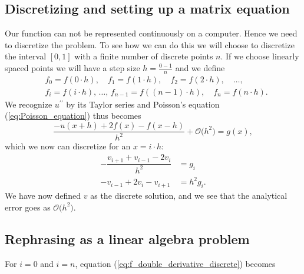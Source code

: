 \documentclass{emulateapj}
\begin{document}
    \subsection{Discretizing and setting up a matrix equation}
        Our function can not be represented continuously on a computer. Hence we need to discretize the problem. To see how we can do this we will choose to discretize the interval \([0,1]\) with a finite number of discrete points \(n\). If we choose linearly spaced points we will have a step size \(h = \frac{0 - 1}{n}\) and we define 
        \begin{align*}
            &f_{0}=f(0\cdot h),\quad f_{1}=f(1\cdot h),\quad f_{2}=f(2\cdot h),\quad \ldots,\\ &f_{i}=f(i\cdot h),\,\ldots,\, f_{n-1}=f((n-1)\cdot h),\quad f_{n}=f(n\cdot h).
        \end{align*}
        We recognize $u^{\prime\prime}$ by its Taylor series and Poisson's equation (\ref{eq:Poisson_equation}) thus becomes
        \begin{equation}\label{eq:f_double_derivative_taylor}
            \frac{-u(x+h) + 2f(x) - f(x-h)}{h^{2}} + \mathcal{O}\big(h^{2}\big) = g(x),
        \end{equation}
        which we now can discretize for an \(x=i\cdot h\):
        \begin{align}\label{eq:f_double_derivative_discrete}
            -\dfrac{v_{i+1} + v_{i-1} - 2v_{i}}{h^{2}} &= g_{i}\nonumber
            \\
            -v_{i-1} + 2v_{i} - v_{i+1} &= h^{2} g_{i}.
        \end{align}
        We have now defined $v$ as the discrete solution, and we see that the analytical error goes as \(\mathcal{O}\big(h^{2}\big)\).
    
    \subsection{Rephrasing as a linear algebra problem}
        
        For \(i=0\) and $i = n$, equation (\ref{eq:f_double_derivative_discrete}) becomes
        
\end{document}
